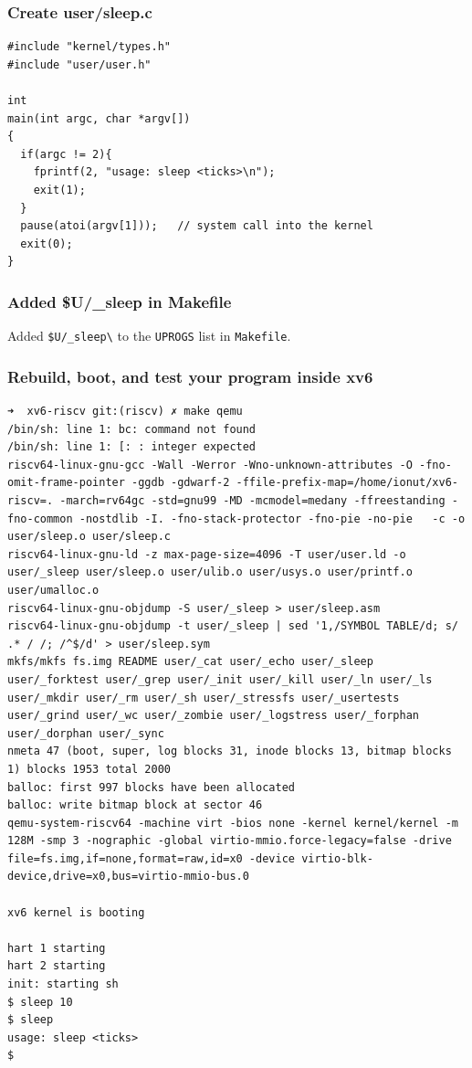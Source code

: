 \documentclass{labreport}
\begin{document}
\subsubsection{Create user/sleep.c}
\begin{lstlisting}[style=c]
#include "kernel/types.h"
#include "user/user.h"

int
main(int argc, char *argv[])
{
  if(argc != 2){
    fprintf(2, "usage: sleep <ticks>\n");
    exit(1);
  }
  pause(atoi(argv[1]));   // system call into the kernel
  exit(0);
}
\end{lstlisting}

\subsubsection{Added \$U/\_sleep in Makefile}
Added \texttt{\$U/\_sleep\textbackslash} to the \texttt{UPROGS} list in \texttt{Makefile}.

\subsubsection{Rebuild, boot, and test your program inside xv6}
\begin{lstlisting}[style=bash]
➜  xv6-riscv git:(riscv) ✗ make qemu
/bin/sh: line 1: bc: command not found
/bin/sh: line 1: [: : integer expected
riscv64-linux-gnu-gcc -Wall -Werror -Wno-unknown-attributes -O -fno-omit-frame-pointer -ggdb -gdwarf-2 -ffile-prefix-map=/home/ionut/xv6-riscv=. -march=rv64gc -std=gnu99 -MD -mcmodel=medany -ffreestanding -fno-common -nostdlib -I. -fno-stack-protector -fno-pie -no-pie   -c -o user/sleep.o user/sleep.c
riscv64-linux-gnu-ld -z max-page-size=4096 -T user/user.ld -o user/_sleep user/sleep.o user/ulib.o user/usys.o user/printf.o user/umalloc.o
riscv64-linux-gnu-objdump -S user/_sleep > user/sleep.asm
riscv64-linux-gnu-objdump -t user/_sleep | sed '1,/SYMBOL TABLE/d; s/ .* / /; /^$/d' > user/sleep.sym
mkfs/mkfs fs.img README user/_cat user/_echo user/_sleep user/_forktest user/_grep user/_init user/_kill user/_ln user/_ls user/_mkdir user/_rm user/_sh user/_stressfs user/_usertests user/_grind user/_wc user/_zombie user/_logstress user/_forphan user/_dorphan user/_sync
nmeta 47 (boot, super, log blocks 31, inode blocks 13, bitmap blocks 1) blocks 1953 total 2000
balloc: first 997 blocks have been allocated
balloc: write bitmap block at sector 46
qemu-system-riscv64 -machine virt -bios none -kernel kernel/kernel -m 128M -smp 3 -nographic -global virtio-mmio.force-legacy=false -drive file=fs.img,if=none,format=raw,id=x0 -device virtio-blk-device,drive=x0,bus=virtio-mmio-bus.0

xv6 kernel is booting

hart 1 starting
hart 2 starting
init: starting sh
$ sleep 10
$ sleep
usage: sleep <ticks>
$
\end{lstlisting}
\end{document}
